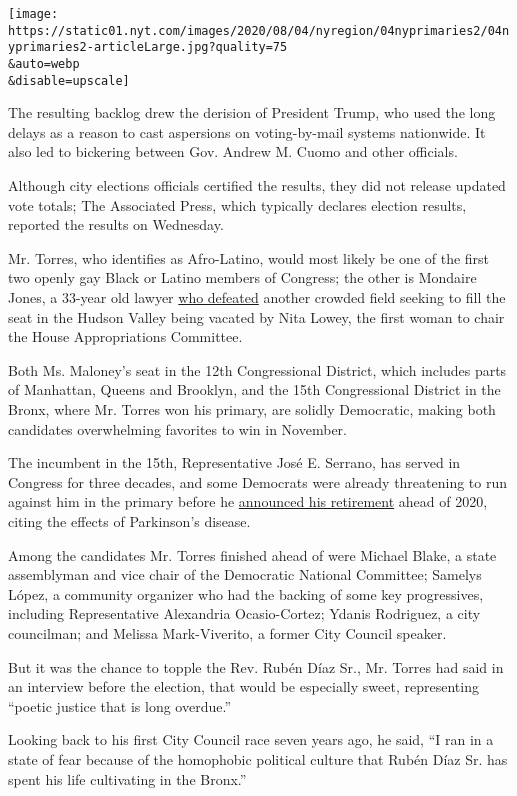 \texttt{[image: https://static01.nyt.com/images/2020/08/04/nyregion/04nyprimaries2/04nyprimaries2-articleLarge.jpg?quality=75\\\&auto=webp\\\&disable=upscale]}

The resulting backlog drew the derision of President Trump, who used the
long delays as a reason to cast aspersions on voting-by-mail systems
nationwide. It also led to bickering between Gov. Andrew M. Cuomo and
other officials.

Although city elections officials certified the results, they did not
release updated vote totals; The Associated Press, which typically
declares election results, reported the results on Wednesday.

Mr. Torres, who identifies as Afro-Latino, would most likely be one of
the first two openly gay Black or Latino members of Congress; the other
is Mondaire Jones, a 33-year old lawyer
\href{https://www.nytimes.com/2020/07/14/nyregion/mondaire-jones-house-primary.html}{who
defeated} another crowded field seeking to fill the seat in the Hudson
Valley being vacated by Nita Lowey, the first woman to chair the House
Appropriations Committee.

Both Ms. Maloney's seat in the 12th Congressional District, which
includes parts of Manhattan, Queens and Brooklyn, and the 15th
Congressional District in the Bronx, where Mr. Torres won his primary,
are solidly Democratic, making both candidates overwhelming favorites to
win in November.

The incumbent in the 15th, Representative José E. Serrano, has served in
Congress for three decades, and some Democrats were already threatening
to run against him in the primary before he
\href{https://www.nytimes.com/2019/03/25/nyregion/jose-serrano-parkinsons-retire.html}{announced
his retirement} ahead of 2020, citing the effects of Parkinson's
disease.

Among the candidates Mr. Torres finished ahead of were Michael Blake, a
state assemblyman and vice chair of the Democratic National Committee;
Samelys López, a community organizer who had the backing of some key
progressives, including Representative Alexandria Ocasio-Cortez; Ydanis
Rodriguez, a city councilman; and Melissa Mark-Viverito, a former City
Council speaker.

But it was the chance to topple the Rev. Rubén Díaz Sr., Mr. Torres had
said in an interview before the election, that would be especially
sweet, representing ``poetic justice that is long overdue.''

Looking back to his first City Council race seven years ago, he said,
``I ran in a state of fear because of the homophobic political culture
that Rubén Díaz Sr. has spent his life cultivating in the Bronx.''


